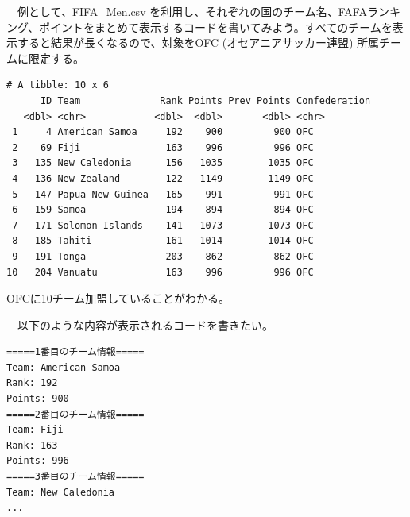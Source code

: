 \documentclass[
  a4paper,
  pandoc,
  ja=standard,
  jafont=haranoaji]{bxjsbook}
\newenvironment{Shaded}{\begin{snugshade}}{\end{snugshade}}
\newcommand{\CommentTok}[1]{\textcolor[rgb]{0.37,0.37,0.37}{#1}}
\newcommand{\FunctionTok}[1]{\textcolor[rgb]{0.28,0.35,0.67}{#1}}
\newcommand{\NormalTok}[1]{\textcolor[rgb]{0.00,0.48,0.65}{#1}}
\newcommand{\OtherTok}[1]{\textcolor[rgb]{0.00,0.48,0.65}{#1}}
\newcommand{\SpecialCharTok}[1]{\textcolor[rgb]{0.37,0.37,0.37}{#1}}
\newcommand{\StringTok}[1]{\textcolor[rgb]{0.13,0.47,0.30}{#1}}
\begin{document}
　例として、\href{/Data/FIFA_Men.csv}{FIFA\_Men.csv}
を利用し、それぞれの国のチーム名、FAFAランキング、ポイントをまとめて表示するコードを書いてみよう。すべてのチームを表示すると結果が長くなるので、対象をOFC
(オセアニアサッカー連盟) 所属チームに限定する。

\begin{Shaded}
\end{Shaded}

\begin{verbatim}
# A tibble: 10 x 6
      ID Team              Rank Points Prev_Points Confederation
   <dbl> <chr>            <dbl>  <dbl>       <dbl> <chr>        
 1     4 American Samoa     192    900         900 OFC          
 2    69 Fiji               163    996         996 OFC          
 3   135 New Caledonia      156   1035        1035 OFC          
 4   136 New Zealand        122   1149        1149 OFC          
 5   147 Papua New Guinea   165    991         991 OFC          
 6   159 Samoa              194    894         894 OFC          
 7   171 Solomon Islands    141   1073        1073 OFC          
 8   185 Tahiti             161   1014        1014 OFC          
 9   191 Tonga              203    862         862 OFC          
10   204 Vanuatu            163    996         996 OFC          
\end{verbatim}

OFCに10チーム加盟していることがわかる。

　以下のような内容が表示されるコードを書きたい。

\begin{verbatim}
=====1番目のチーム情報=====
Team: American Samoa
Rank: 192
Points: 900
=====2番目のチーム情報=====
Team: Fiji
Rank: 163
Points: 996
=====3番目のチーム情報=====
Team: New Caledonia
...
\end{verbatim}
\end{document}

